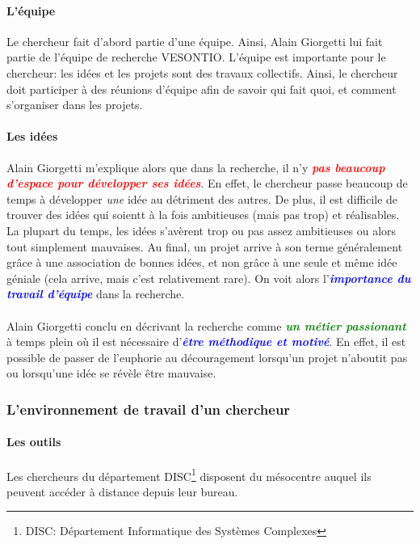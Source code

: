 \documentclass[a4paper,12pt, draft]{report}
\newcommand{\goodPoint}[1]{\textcolor{green}{\textbf{\textit{#1}}}}
\newcommand{\badPoint}[1]{\textcolor{red}{\textbf{\textit{#1}}}}
\newcommand{\importantPoint}[1]{\textcolor{blue}{\textbf{\textit{#1}}}}
\begin{document}
\paragraph{L'équipe}
Le chercheur fait d'abord partie d'une équipe. Ainsi, Alain Giorgetti lui fait partie de l'équipe de recherche VESONTIO. L'équipe est importante pour le chercheur: les idées et les projets sont des travaux collectifs. Ainsi, le chercheur doit participer à des réunions d'équipe afin de savoir qui fait quoi, et comment s'organiser dans les projets.

\paragraph{Les idées}
Alain Giorgetti m'explique alors que dans la recherche, il n'y \badPoint{pas beaucoup d'espace pour développer ses idées}. En effet, le chercheur passe beaucoup de temps à développer \textit{une} idée au détriment des autres.
De plus, il est difficile de trouver des idées qui soientt à la fois ambitieuses (mais pas trop) et réalisables. La plupart du temps, les idées s'avèrent trop ou pas assez ambitieuses ou alors tout simplement mauvaises. Au final, un projet arrive à son terme généralement grâce à une association de bonnes idées, et non grâce à une seule et même idée géniale (cela arrive, mais c'est relativement rare).
On voit alors l'\importantPoint{importance du travail d'équipe} dans la recherche.

\paragraph{}
Alain Giorgetti conclu en décrivant la recherche comme \goodPoint{un métier passionant} à temps plein où il est nécessaire d'\importantPoint{être méthodique et motivé}. En effet, il est possible de passer de l'euphorie au découragement lorsqu'un projet n'aboutit pas ou lorsqu'une idée se révèle être mauvaise.


\subsubsection{L'environnement de travail d'un chercheur}
\paragraph{Les outils}
Les chercheurs du département DISC\footnote{\textsc{DISC}: Département Informatique des Systèmes Complexes} disposent du mésocentre auquel ils peuvent accéder à distance depuis leur bureau.
\end{document}
